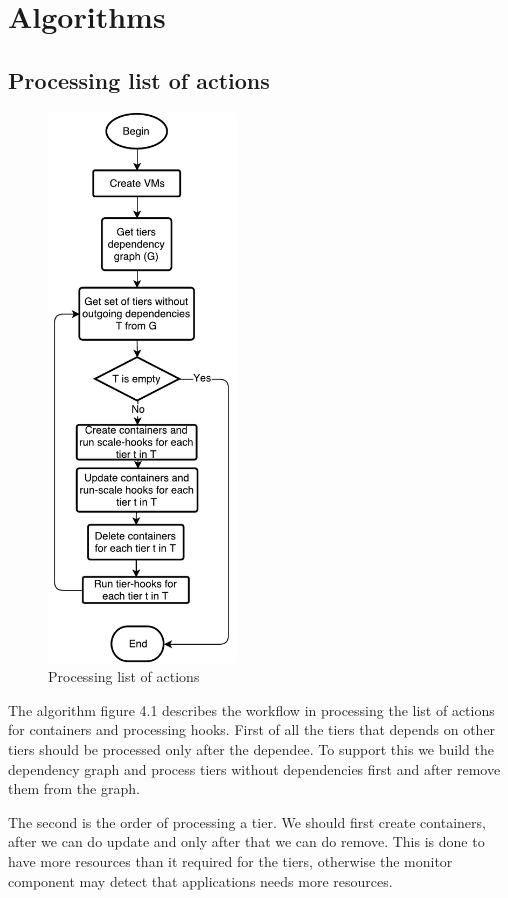 \section{Algorithms}
\subsection{Processing list of actions}
\begin{figure}[ht]
  \centering
    \includegraphics[height=550px,natwidth=219,natheight=635]{./pictures/algorithm1}
    \caption{Processing list of actions }
\end{figure}
The algorithm figure 4.1 describes the workflow in processing the list of actions for containers and processing hooks. First of all the tiers that depends on other tiers should be processed only after the dependee. To support this we build the dependency graph and process tiers without dependencies first and after remove them from the graph.

The second is the order of processing a tier. We should first create containers, after we can do update and only after that we can do remove. This is done to have more resources than it required for the tiers, otherwise the monitor component may detect that applications needs more resources.

